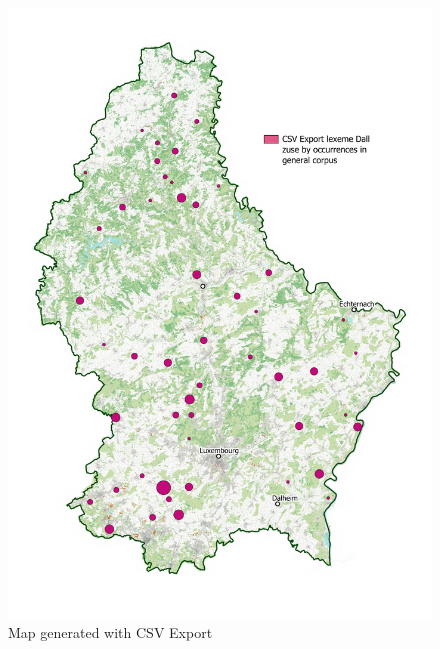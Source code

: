 \documentclass[10pt,a4paper]{article}
\begin{document}
\begin{figure}
\includegraphics[width=\linewidth]{images/topolux1.pdf}
\centering
\caption{Map generated with CSV Export} \label{fig:topodallmap}
\end{figure}
\end{document}
